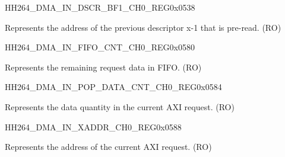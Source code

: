 \begin{register}{H}{H264\_DMA\_IN\_DSCR\_BF1\_CH0\_REG}{0x0538}\label{regdesc:H264DMAINDSCRBF1CH0REG}
%
\regnewline%
\begin{regdesc}\begin{reglist}
\label{fielddesc:H264DMAINLINKDSCRBF1CH0}\item [H264\_DMA\_INLINK\_DSCR\_BF1\_CH0] Represents the address of the previous descriptor x-1 that is pre-read. (RO)
\end{reglist}\end{regdesc}
\end{register}

\begin{register}{H}{H264\_DMA\_IN\_FIFO\_CNT\_CH0\_REG}{0x0580}\label{regdesc:H264DMAINFIFOCNTCH0REG}
%
%
\regnewline%
\begin{regdesc}\begin{reglist}
\label{fielddesc:H264DMAINCMDFIFOINFIFOCNTCH0}\item [H264\_DMA\_IN\_CMDFIFO\_INFIFO\_CNT\_CH0] Represents the remaining request data in FIFO. (RO)
\end{reglist}\end{regdesc}
\end{register}


\begin{register}{H}{H264\_DMA\_IN\_POP\_DATA\_CNT\_CH0\_REG}{0x0584}\label{regdesc:H264DMAINPOPDATACNTCH0REG}
%
%
\regnewline%
\begin{regdesc}\begin{reglist}
\label{fielddesc:H264DMAINCMDFIFOPOPDATACNTCH0}\item [H264\_DMA\_IN\_CMDFIFO\_POP\_DATA\_CNT\_CH0] Represents the data quantity in the current AXI request. (RO)
\end{reglist}\end{regdesc}
\end{register}


\begin{register}{H}{H264\_DMA\_IN\_XADDR\_CH0\_REG}{0x0588}\label{regdesc:H264DMAINXADDRCH0REG}
%
\regnewline%
\begin{regdesc}\begin{reglist}
\label{fielddesc:H264DMAINCMDFIFOXADDRCH0}\item [H264\_DMA\_IN\_CMDFIFO\_XADDR\_CH0] Represents the address of the current AXI request. (RO)
\end{reglist}\end{regdesc}
\end{register}


